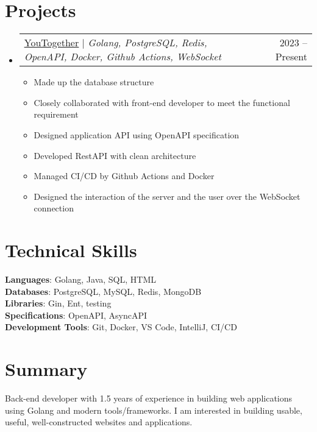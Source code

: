 \documentclass[letterpaper,11pt]{article}
\makeatletter
\newcommand{\resumeItem}[1]{
  \item\small{
    {#1 \vspace{-2pt}}
  }
}
\newcommand{\resumeProjectHeading}[2]{
    \item
    \begin{tabular*}{0.97\textwidth}{l@{\extracolsep{\fill}}r}
      \small#1 & #2 \\
    \end{tabular*}\vspace{-7pt}
}
\newcommand{\resumeSubHeadingListStart}{\begin{itemize}[leftmargin=0.15in, label={}]}
\newcommand{\resumeSubHeadingListEnd}{\end{itemize}}
\newcommand{\resumeItemListStart}{\begin{itemize}}
\newcommand{\resumeItemListEnd}{\end{itemize}\vspace{-5pt}}
\makeatother
\begin{document}
\section{Projects}
\resumeSubHeadingListStart
\resumeProjectHeading
{\href{https://github.com/youtogether-online}{\underline{YouTogether}} $|$ \emph{Golang, PostgreSQL, Redis, OpenAPI, Docker, Github Actions, WebSocket}}{2023 -- Present}
\resumeItemListStart
\resumeItem{Made up the database structure}
\resumeItem{Closely collaborated with front-end developer to meet the functional requirement}
\resumeItem{Designed application API using OpenAPI specification}
\resumeItem{Developed RestAPI with clean architecture}
\resumeItem{Managed CI/CD by Github Actions and Docker}
\resumeItem{Designed the interaction of the server and the user over the WebSocket connection}
\resumeItemListEnd
\resumeSubHeadingListEnd

\section{Technical Skills}
\begin{itemize}[leftmargin=0.15in, label={}]
	\small{\item{
		\textbf{Languages}{: Golang, Java, SQL, HTML} \\
		\textbf{Databases}{: PostgreSQL, MySQL, Redis, MongoDB} \\
		\textbf{Libraries}{: Gin, Ent, testing} \\
		\textbf{Specifications}{: OpenAPI, AsyncAPI} \\
		\textbf{Development Tools}{: Git, Docker, VS Code, IntelliJ, CI/CD} \\
	}}
\end{itemize}

\section{Summary}
\begin{itemize}[leftmargin=0.15in, label={}]
\small{\item{Back-end developer with 1.5 years of experience in building web applications using Golang and modern tools/frameworks. I am interested in building usable, useful, well-constructed websites and applications. } \
}
\end{itemize}

\end{document}
